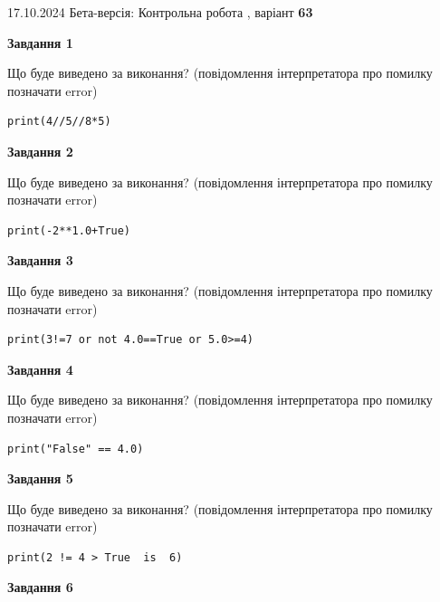 \documentclass[12pt, ukrainian]{article}
\begin{document}
{\Large{17.10.2024 Бета-версія: Контрольна робота , варіант  \No \textbf { 63 }\par}}
{
\begin {large}
{\begin {center}\textbf{Завдання 1}\end {center}}

Що буде виведено за виконання? (повідомлення інтерпретатора про помилку позначати error)\par
\begin{verbatim}
print(4//5//8*5)
\end{verbatim}

{\begin {center}\textbf{Завдання 2}\end {center}}

Що буде виведено за виконання? (повідомлення інтерпретатора про помилку позначати error)\par
\begin{verbatim}
print(-2**1.0+True)
\end{verbatim}

{\begin {center}\textbf{Завдання 3}\end {center}}

Що буде виведено за виконання? (повідомлення інтерпретатора про помилку позначати error)\par
\begin{verbatim}
print(3!=7 or not 4.0==True or 5.0>=4)
\end{verbatim}

{\begin {center}\textbf{Завдання 4}\end {center}}

Що буде виведено за виконання? (повідомлення інтерпретатора про помилку позначати error)\par
\begin{verbatim}
print("False" == 4.0)
\end{verbatim}

{\begin {center}\textbf{Завдання 5}\end {center}}

Що буде виведено за виконання? (повідомлення інтерпретатора про помилку позначати error)\par
\begin{verbatim}
print(2 != 4 > True  is  6)
\end{verbatim}

{\begin {center}\textbf{Завдання 6}\end {center}}


\end{large}}
\end{document}
